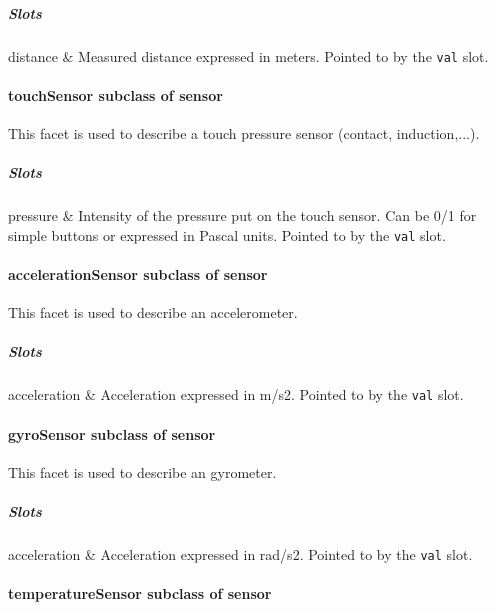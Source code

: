 \subparagraph{Slots}

\begin{slots}
distance &
Measured distance expressed in meters.
Pointed to by the \texttt{val} slot.\\\hline
\end{slots}


\paragraph{ touchSensor  \textmd{subclass of sensor}}

This facet is used to describe a touch pressure sensor (contact,
induction,...).

\subparagraph{Slots}

\begin{slots}
pressure &
Intensity of the pressure put on the
touch sensor. Can be 0/1 for simple buttons or expressed in Pascal
units. Pointed to by the \texttt{val} slot.\\\hline
\end{slots}


\paragraph{ accelerationSensor  \textmd{subclass of sensor}}

This facet is used to describe an accelerometer.

\subparagraph{Slots}

\begin{slots}
acceleration &
Acceleration expressed in m/s2.
Pointed to by the \texttt{val} slot.\\\hline
\end{slots}

\paragraph{gyroSensor  \textmd{subclass of sensor}}

This facet is used to describe an gyrometer.

\subparagraph{Slots}

\begin{slots}
acceleration &
Acceleration expressed in rad/s2.
Pointed to by the \texttt{val} slot.\\\hline
\end{slots}

\paragraph{ temperatureSensor  \textmd{subclass of sensor}}


